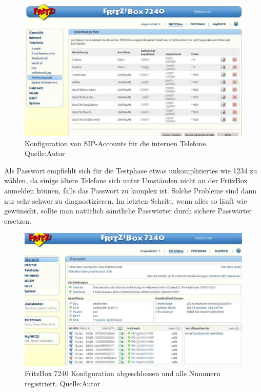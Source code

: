 \documentclass[a4paper,12pt]{scrbook}
\begin{document}
\begin{figure}[H]
\begin{center}
\includegraphics[width=1\hsize]{./images/voip-server-fritzbox-telefoniegeraete.png}
\end{center}
\caption[Konfiguration von SIP-Accounts für die internen Telefone.]
{\label{voip-server-fritzbox-intsip}Konfiguration von SIP-Accounts für die internen Telefone. Quelle:Autor}
\end{figure}

Als Passwort empfiehlt sich für die Testphase etwas 
unkompliziertes wie 1234 zu wählen, da einige ältere Telefone sich unter Umständen nicht an der FritzBox anmelden können, falls das Passwort zu komplex ist.
Solche Probleme sind dann nur sehr schwer zu diagnostizieren. Im letzten Schritt, wenn alles so läuft wie gewünscht, sollte man natürlich sämtliche Passwörter
durch sichere Passwörter ersetzen.

\begin{figure}[H]
\begin{center}
\includegraphics[width=1\hsize]{./images/voip-server-fritzbox-status.png}
\end{center}
\caption[FritzBox 7240 Konfiguration abgeschlossen und alle Nummern registriert.]
{\label{voip-server-fritzbox-status}FritzBox 7240 Konfiguration abgeschlossen und alle Nummern registriert. Quelle:Autor}
\end{figure}
\end{document}
